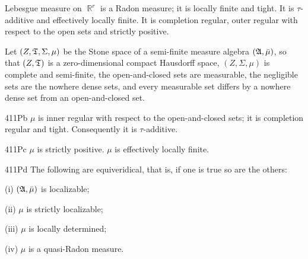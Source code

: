  Lebesgue measure on $\BbbR^r$ is a Radon
measure;   it is locally
finite and tight.   It is $\tau$-additive and
effectively locally finite.   It is completion
regular, outer regular with respect to the open
sets and strictly positive.

 Let $(Z,\frak T,\Sigma,\mu)$
be the Stone space of a semi-finite measure algebra
$(\frak A,\bar\mu)$, so that $(Z,\frak T)$ is a
zero-dimensional compact Hausdorff space, $(Z,\Sigma,\mu)$ is complete
and semi-finite, the open-and-closed sets are measurable, the negligible
sets are the nowhere dense sets, and every measurable set differs by a
nowhere dense set from an open-and-closed set.

\spheader 411Pb $\mu$ is inner regular with respect to the
open-and-closed sets;   it
is completion regular and tight.   Consequently it is
$\tau$-additive.

\spheader 411Pc $\mu$ is strictly positive.   $\mu$ is effectively
locally finite.   


\spheader 411Pd The following are equiveridical, that is, if one is true
so are the others:

\quad (i) $(\frak A,\bar\mu)$ is localizable;

\quad(ii) $\mu$ is strictly localizable;

\quad(iii) $\mu$ is locally determined;

\quad(iv) $\mu$ is a quasi-Radon measure.


